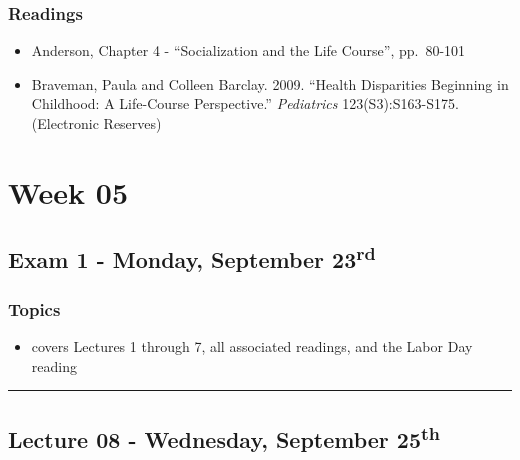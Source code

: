 \documentclass[]{book}
\providecommand{\tightlist}{%
  \setlength{\itemsep}{0pt}\setlength{\parskip}{0pt}}
\begin{document}
\hypertarget{readings-7}{%
\subsubsection*{Readings}\label{readings-7}}

\begin{itemize}
\tightlist
\item
  Anderson, Chapter 4 - ``Socialization and the Life Course'', pp.~80-101
\item
  Braveman, Paula and Colleen Barclay. 2009. ``Health Disparities Beginning in Childhood: A Life-Course Perspective.'' \emph{Pediatrics} 123(S3):S163-S175. (Electronic Reserves)
\end{itemize}

\hypertarget{week-05}{%
\section*{Week 05}\label{week-05}}

\hypertarget{exam-1---monday-september-23rd}{%
\subsection*{\texorpdfstring{Exam 1 - Monday, September 23\textsuperscript{rd}}{Exam 1 - Monday, September 23rd}}\label{exam-1---monday-september-23rd}}

\hypertarget{topics-8}{%
\subsubsection*{Topics}\label{topics-8}}

\begin{itemize}
\tightlist
\item
  covers Lectures 1 through 7, all associated readings, and the Labor Day reading
\end{itemize}

\begin{center}\rule{0.5\linewidth}{\linethickness}\end{center}

\hypertarget{lecture-08---wednesday-september-25th}{%
\subsection*{\texorpdfstring{Lecture 08 - Wednesday, September 25\textsuperscript{th}}{Lecture 08 - Wednesday, September 25th}}\label{lecture-08---wednesday-september-25th}}
\end{document}
